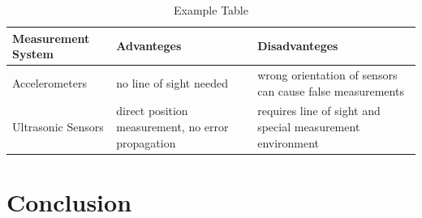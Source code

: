 \documentclass[conference]{IEEEtran}
\begin{document}
\begin{table}[htbp]
\caption{Example Table}
\begin{center}
\begin{tabularx}{\linewidth}{|Y|Y|Y|}
\hline
\textbf{Measurement System}&\textbf{Advanteges}&\textbf{Disadvanteges} \\
\hline
Accelerometers & no line of sight needed & wrong orientation of sensors can cause false measurements \\
\hline
Ultrasonic Sensors & direct position measurement, no error propagation & requires line of sight and special measurement environment  \\
\hline

\end{tabularx}
\label{tab1}
\end{center}
\end{table}

\section{Conclusion} 


\AtNextBibliography{\small}
\printbibliography
\end{document}
